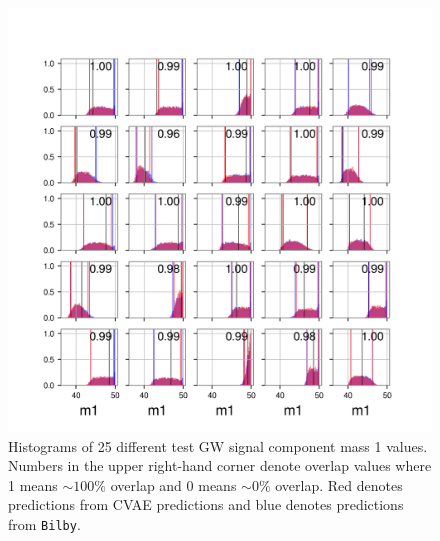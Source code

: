 \documentclass[%
showpacs,
 amsmath,amssymb,
 aps,
 twocolumn,
 prl,
 reprint,
floatfix,
]{revtex4-1}
\begin{document}
%
%
\begin{figure}
    \includegraphics[width=\columnwidth]{images/latest-1d_0.png}
    \caption{\label{fig:1D_overlap} Histograms of 
    25 different test GW signal component mass 1 values. 
    Numbers in the upper right-hand corner denote overlap 
    values where 1 means $\sim{100}\%$ overlap and 0 
    means $\sim{0}\%$ overlap.
    Red denotes predictions from CVAE predictions and blue 
    denotes predictions from \texttt{Bilby}.}
\end{figure}
\end{document}
